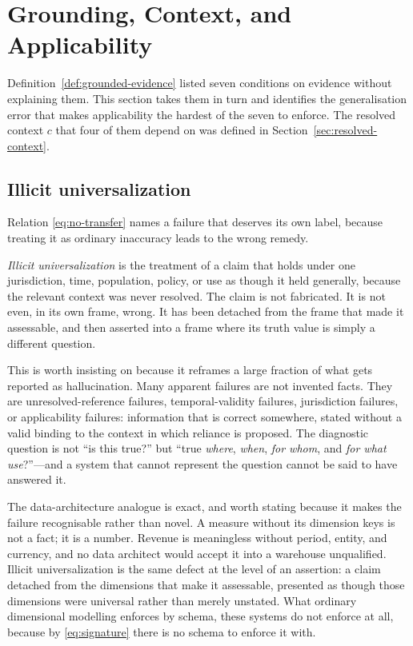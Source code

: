 \section{Grounding, Context, and Applicability}
\label{sec:grounding-context}

Definition~\ref{def:grounded-evidence} listed seven conditions on evidence without
explaining them. This section takes them in turn and identifies the generalisation error
that makes applicability the hardest of the seven to enforce. The resolved context $c$
that four of them depend on was defined in Section~\ref{sec:resolved-context}.

\subsection{Illicit universalization}
\label{sec:illicit}

Relation \eqref{eq:no-transfer} names a failure that deserves its own label,
because treating it as ordinary inaccuracy leads to the wrong remedy.

\emph{Illicit universalization} is the treatment of a claim that holds under one
jurisdiction, time, population, policy, or use as though it held generally, because
the relevant context was never resolved. The claim is not fabricated. It is not
even, in its own frame, wrong. It has been detached from the frame that made it
assessable, and then asserted into a frame where its truth value is simply a
different question.

This is worth insisting on because it reframes a large fraction of what gets
reported as hallucination. Many apparent failures are not invented facts. They are
unresolved-reference failures, temporal-validity failures, jurisdiction failures,
or applicability failures: information that is correct somewhere, stated without a
valid binding to the context in which reliance is proposed. The diagnostic question
is not ``is this true?'' but ``true \emph{where}, \emph{when}, \emph{for whom}, and
\emph{for what use}?''---and a system that cannot represent the question cannot be
said to have answered it.

The data-architecture analogue is exact, and worth stating because it makes the
failure recognisable rather than novel. A measure without its dimension keys is not
a fact; it is a number. Revenue is meaningless without period, entity, and currency,
and no data architect would accept it into a warehouse unqualified. Illicit
universalization is the same defect at the level of an assertion: a claim detached
from the dimensions that make it assessable, presented as though those dimensions
were universal rather than merely unstated. What ordinary dimensional modelling
enforces by schema, these systems do not enforce at all, because by
\eqref{eq:signature} there is no schema to enforce it with.

